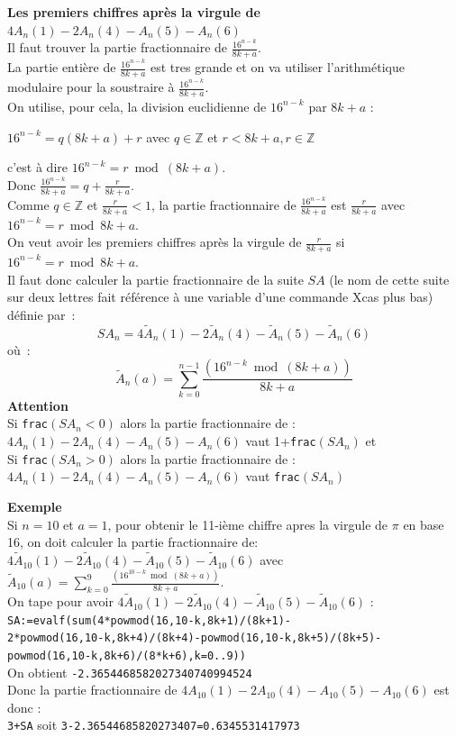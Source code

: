 \documentclass[a4paper,11pt]{book}
\begin{document}
{\bf Les premiers chiffres apr\`es la virgule de $4A_{n}(1)-2A_{n}(4)-A_{n}(5)-A_{n}(6)$}\\
Il faut trouver la partie fractionnaire de $\frac{16^{n-k}}{8k+a}$.\\
La partie enti\`ere de $\frac{16^{n-k}}{8k+a}$ est tres grande et on va utiliser
l'arithmétique modulaire pour la soustraire \`a $\frac{16^{n-k}}{8k+a}$. \\
On utilise, pour cela, la division euclidienne de $16^{n-k}$ par
$8k+a$ :
\begin{center}
$16^{n-k}=q(8k+a)+r$ avec $q\in \mathbb{Z}$ et $r< 8k+a, r\in\mathbb{Z}$
\end{center}
c'est \`a dire $16^{n-k}=r \bmod (8k+a)$.\\
Donc $\frac{16^{n-k}}{8k+a}=q+\frac{r}{8k+a}$.\\
Comme $q\in \mathbb{Z}$ et $\frac{r}{8k+a}<1$, la partie fractionnaire de
$\frac{16^{n-k}}{8k+a}$ est $\frac{r}{8k+a}$ avec $16^{n-k}=r \bmod 8k+a$.\\
On veut avoir les premiers chiffres apr\`es la virgule de $\frac{r}{8k+a}$
si $16^{n-k}=r \bmod 8k+a$.\\
Il faut donc calculer la partie fractionnaire de la suite $SA$
(le nom de cette suite sur deux lettres fait r\'ef\'erence \`a une variable
d'une commande Xcas plus bas) d\'efinie par~:
$$SA_n=4\tilde{A}_{n}(1)-2\tilde{A}_{n}(4)-\tilde{A}_{n}(5)-\tilde{A}_{n}(6)$$
o\`u~:
$$\tilde{A}_n(a)=\sum_{k=0}^{n-1} \frac{(16^{n-k}\bmod (8k+a))}{8k+a}$$
{\bf Attention} \\
Si {\tt frac}$(SA_n<0)$ alors la partie fractionnaire de :\\
$4A_{n}(1)-2A_{n}(4)-A_{n}(5)-A_{n}(6)$ vaut 1+{\tt frac}$(SA_n)$ et\\
Si {\tt frac}$(SA_n>0)$ alors la partie fractionnaire de :\\
$4A_{n}(1)-2A_{n}(4)-A_{n}(5)-A_{n}(6)$ vaut {\tt frac}$(SA_n)$

{\bf Exemple}\\
Si $n=10$ et $a=1$, pour obtenir le 11-i\`eme chiffre apres la virgule de $\pi$
en base 16, on doit calculer la partie fractionnaire de:\\
$4\tilde{A}_{10}(1)-2\tilde{A}_{10}(4)-\tilde{A}_{10}(5)-\tilde{A}_{10}(6)$ avec\\
$\tilde{A}_{10}(a)=\sum_{k=0}^9\frac{(16^{10-k}\bmod (8k+a))}{8k+a}$.\\
On tape pour avoir $4\tilde{A}_{10}(1)-2\tilde{A}_{10}(4)-\tilde{A}_{10}(5)-\tilde{A}_{10}(6)$ :\\
{\tt SA:=evalf(sum(4*powmod(16,10-k,8k+1)/(8k+1)- \\
2*powmod(16,10-k,8k+4)/(8k+4)-powmod(16,10-k,8k+5)/(8k+5)-\\
powmod(16,10-k,8k+6)/(8*k+6),k=0..9))}\\
On obtient
{\tt -2.3654468582027340740994524}\\
Donc la partie fractionnaire de $4A_{10}(1)-2A_{10}(4)-A_{10}(5)-A_{10}(6)$ est
donc :\\
{\tt 3+SA} soit {\tt 3-2.36544685820273407=0.6345531417973}
\end{document}
